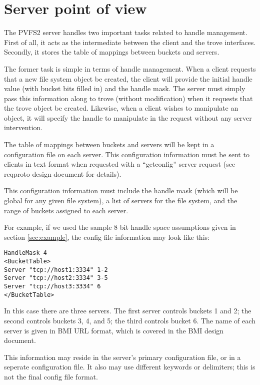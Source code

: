 \documentclass[12pt]{article} %
\begin{document}
\section{Server point of view}

The PVFS2 server handles two important tasks related to handle management.
First of all, it acts as the intermediate between the client
and the trove interfaces.  Secondly, it stores the table of mappings
between buckets and servers.

The former task is simple in terms of handle management.  When a client
requests that a new file system object be created, the client will provide the
initial handle value (with bucket bits filled in) and the handle mask.
The server must simply pass this information along to trove (without
modification) when it requests that the trove object be created.
Likewise, when a client wishes to manipulate an object, it will specify
the handle to manipulate in the request without any server intervention.

The table of mappings between buckets and servers will be kept in a
configuration file on each server.  This configuration information must
be sent to clients in text format when requested with a ``getconfig''
server request (see reqproto design document for details).

This configuration information must include the handle mask (which will
be global for any given file system), a list of servers for the file
system, and the range of buckets assigned to each server.

For example, if we used the sample 8 bit handle space assumptions given
in section \ref{sec:example}, the config file information may look like
this:

\begin{verbatim}
HandleMask 4
<BucketTable>
Server "tcp://host1:3334" 1-2
Server "tcp://host2:3334" 3-5
Server "tcp://host3:3334" 6
</BucketTable>
\end{verbatim}

In this case there are three servers.  The first server controls buckets
1 and 2; the second controls buckets 3, 4, and 5; the third controls
bucket 6.  The name of each server is given in BMI URL format, which is
covered in the BMI design document.

This information may reside in the server's primary configuration file,
or in a seperate configuration file.  It also may use different keywords
or delimiters; this is not the final config file format.
\end{document}
